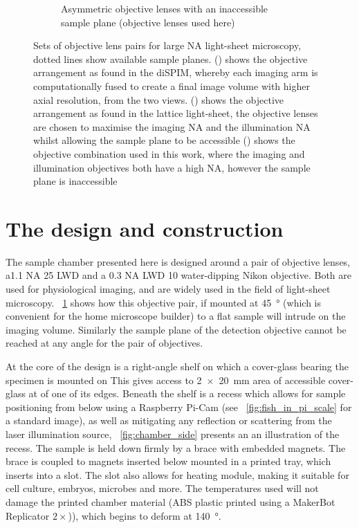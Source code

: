 \begin{figure}
\begin{subfigure}[t]{0.45\linewidth}
        \caption{Asymmetric objective lenses with an inaccessible \gls{sample plane} (objective lenses used here)}\label{fig:assymetric_nikon}
    \end{subfigure}
    \caption[Sets of objective lens pairs for large \gls{NA} \gls{light-sheet} microscopy]{
    Sets of objective lens pairs for large \gls{NA} \gls{light-sheet} microscopy, dotted lines show available sample planes.
    () shows the objective arrangement as found in the \gls{diSPIM}, whereby each imaging arm is computationally fused to create a final image volume with higher axial resolution, from the two views.
    () shows the objective arrangement as found in the \gls{lattice light-sheet}, the objective lenses are chosen to maximise the imaging \gls{NA} and the illumination \gls{NA} whilst allowing the sample plane to be accessible
    () shows the objective combination used in this work, where the imaging and illumination objectives both have a high \gls{NA}, however the \gls{sample plane} is inaccessible
    }\label{fig:objective_matching}
\end{figure}

\section{The design and construction}

The sample chamber presented here is designed around a pair of objective lenses, a1.1 \gls{NA} \SI{25}{\times} \gls{LWD} and a 0.3 \gls{NA} LWD \SI{10}{\times} water-dipping Nikon objective.
Both are used for physiological imaging, and are widely used in the field of light-sheet microscopy.
\figurename~\ref{fig:assymetric_nikon} shows how this objective pair, if mounted at \SI{45}{\degree} (which is convenient for the home microscope builder) to a flat sample will intrude on the imaging volume.
Similarly the sample plane of the detection objective cannot be reached at any angle for the pair of objectives.

At the core of the design is a right-angle shelf on which a cover-glass bearing the specimen is mounted on
This gives access to \SI{2x20}{\milli\metre} area of accessible cover-glass at of one of its edges.
Beneath the shelf is a recess which allows for sample positioning from below using a Raspberry Pi-Cam (see \figurename~\ref{fig:fish_in_pi_scale} for a standard image), as well as mitigating any reflection or scattering from the laser illumination source, \figurename~\ref{fig:chamber_side} presents an an illustration of the recess.
The sample is held down firmly by a  brace with embedded magnets.
The brace is coupled to magnets inserted below mounted in a printed tray, which inserts into a slot.
The slot also allows for heating module, making it suitable for cell culture, embryos, microbes and more.
The temperatures used will not damage the printed chamber material (\gls{ABS} plastic printed using a MakerBot Replicator \(2\times\))), which begins to deform at \SI{140}{\degree}.

